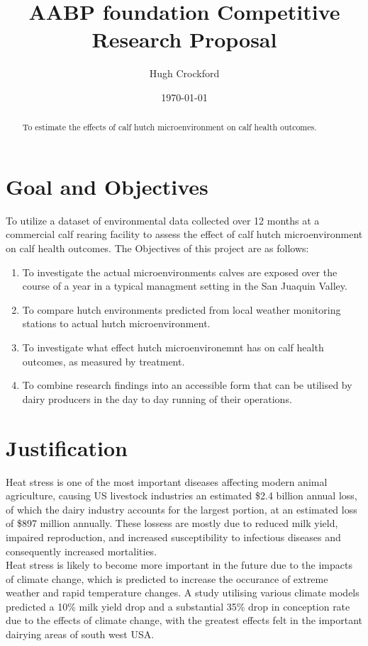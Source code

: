 \documentclass[12pt]{article}
\title{AABP foundation Competitive Research Proposal}
\author{Hugh Crockford}
\date{\today}
\begin{document}
	\maketitle
	\tableofcontents
	
	\newpage
	\begin{abstract}
		To estimate the effects of calf hutch microenvironment on calf health outcomes.
	\end{abstract}
	\section{Goal and Objectives}
	To utilize a dataset of environmental data collected over 12 months at a commercial calf rearing facility to assess the effect of calf hutch microenvironment on calf health outcomes.
	The Objectives of this project are as follows:
	\begin{enumerate}
		\item To investigate the actual microenvironments calves are exposed over the course of a year in a typical managment setting in the San Juaquin Valley.
		\item To compare hutch environments predicted from local weather monitoring stations to actual hutch microenvironment.
		\item To investigate what effect hutch microenvironemnt has on calf health outcomes, as measured by treatment.
		\item To combine research findings into an accessible form that can be utilised by dairy producers in the day to day running of their operations.
	\end{enumerate}


	\newpage
	\section{Justification}
	Heat stress is one of the most important diseases affecting modern animal agriculture, causing US livestock industries an estimated \$2.4 billion annual loss, of which the dairy industry accounts for the largest portion, at an estimated loss of \$897 million annually\cite{St-Pierre2003}. 
	These lossess are mostly due to reduced milk yield, impaired reproduction, and increased susceptibility to infectious diseases and consequently increased mortalities.\cite{Kadzere2002,Hammami2013}\\
	Heat stress is likely to become more important in the future due to the impacts of climate change, which is predicted to increase the occurance of extreme weather and rapid temperature changes\cite{Parry2007}. A study utilising various climate models predicted a 10\% milk yield drop and a substantial 35\% drop in conception rate due to the effects of climate change, with the greatest effects felt in the important dairying areas of south west USA\cite{Klinedinst1993}.\\
\end{document}
